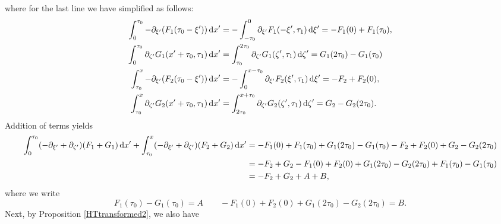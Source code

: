 \documentclass[10pt,reqno,oneside,a4paper, landscape]{article}
\begin{document}
where for the last line we have simplified as follows:
\begin{align*}
\int^{\tau_0}_{0} -\partial_{\xi'}(F_1(\tau_0 - \xi')) \,\mathrm{d} x' &=  -\int^{0}_{-\tau_0}\partial_{\xi'} F_1(-\xi', \tau_1) \,\mathrm{d} \xi' = -F_1(0) + F_1(\tau_0), \\
\int^{\tau_0}_{0} \partial_{\zeta'} G_1(x'+\tau_0, \tau_1) \,\mathrm{d} x' &=  \int^{2\tau_0}_{\tau_0}\partial_{\zeta'} G_1(\zeta', \tau_1) \,\mathrm{d} \zeta'  = G_1(2\tau_0) - G_1(\tau_0) \\
\int_{\tau_0}^{x} -\partial_{\xi'}(F_2(\tau_0 - \xi')) \,\mathrm{d} x' &=  -\int_{0}^{x-\tau_0}\partial_{\xi'} F_2(\xi', \tau_1) \,\mathrm{d} \xi' = -F_2 + F_2(0), \\
\int_{\tau_0}^{x} \partial_{\zeta'} G_2(x'+\tau_0, \tau_1) \,\mathrm{d} x' &=  \int_{2\tau_0}^{x+\tau_0}\partial_{\zeta'} G_2(\zeta', \tau_1) \,\mathrm{d} \zeta'  = G_2 - G_2(2\tau_0).
\end{align*}
Addition of terms yields
\begin{align*}
\int^{\tau_0}_{0} (-\partial_{\xi'} + \partial_{\zeta'}) (F_1+G_1) \,\mathrm{d} x' + \int_{\tau_0}^{x} (-\partial_{\xi'} + \partial_{\zeta'}) (F_2+G_2) \,\mathrm{d} x' &=  -F_1(0) + F_1(\tau_0) + G_1(2\tau_0) - G_1(\tau_0) -F_2 + F_2(0) + G_2 - G_2(2\tau_0) \\
&= -F_2  + G_2 -F_1(0) + F_2(0) + G_1(2\tau_0)- G_2(2\tau_0) + F_1(\tau_0)- G_1(\tau_0) \\
&=  -F_2  + G_2 + A + B,
\end{align*}
where we write 
\[ F_1(\tau_0)- G_1(\tau_0) = A \qquad -F_1(0) + F_2(0) + G_1(2\tau_0)- G_2(2\tau_0) = B.\]
Next, by Proposition \ref{HTtransformed2}, we also have 
\end{document}
